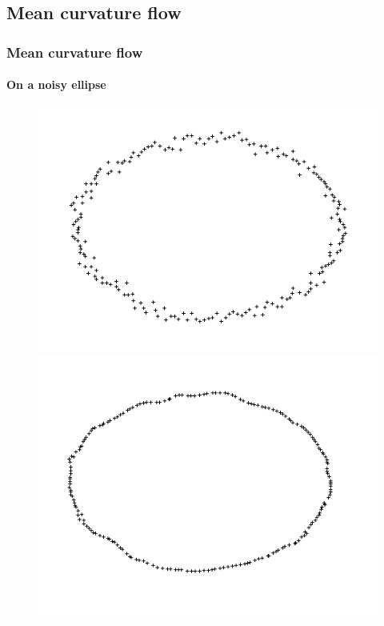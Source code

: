 \documentclass{beamer}
\begin{document}
\begin{frame}
\begin{figure}
\begin{subfigure}{.45\textwidth}
        \end{subfigure}
    \end{figure}
\end{frame}

\subsection{Mean curvature flow}
\begin{frame}[allowframebreaks]
    \frametitle{Mean curvature flow}
    \framesubtitle{On a noisy ellipse}


    \begin{figure}
        \centering
        \includegraphics[scale=0.18]{img/ellipse-area-dense-0}
        \includegraphics[scale=0.18]{img/ellipse-area-dense-10}

\end{figure}
\end{frame}
\end{document}

